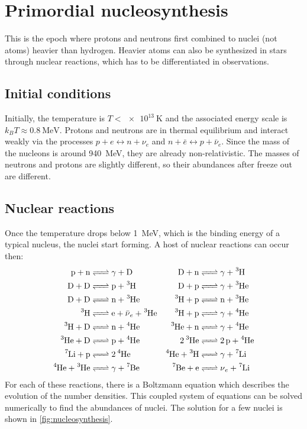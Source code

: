 \section{Primordial nucleosynthesis}

This is the epoch where protons and neutrons first combined to nuclei (not atoms) heavier than hydrogen. Heavier atoms can also be synthesized in stars through nuclear reactions, which has to be differentiated in observations.

\subsection*{Initial conditions}

Initially, the temperature is $T < \SI{e13}{\kelvin}$ and the associated energy scale is $k_B T \approx \SI{0.8}{\MeV}$. Protons and neutrons are in thermal equilibrium and interact weakly via the processes $p + e \leftrightarrow n + \nu_e$ and $n + \bar{e} \leftrightarrow p + \bar{\nu}_e$. Since the mass of the nucleons is around \SI{940}{\MeV}, they are already non-relativistic. The masses of neutrons and protons are slightly different, so their abundances after freeze out are different.

\subsection*{Nuclear reactions}

Once the temperature drops below \SI{1}{\MeV}, which is the binding energy of a typical nucleus, the nuclei start forming. A host of nuclear reactions can occur then:
\begin{align*}
	\ce{p + n &<=> \gamma{} + D} &
	\ce{D + n &<=> \gamma{} + ^3H} \\
	\ce{D + D &<=> p + ^3H} &
	\ce{D + p &<=> \gamma{} + ^3He} \\
	\ce{D + D &<=> n + ^3He} &
	\ce{^3H + p &<=> n + ^3He} \\
	\ce{^3H &<=> e + \bar{\nu}_e + ^3He} &
	\ce{^3H + p &<=> \gamma{} + ^4He} \\
	\ce{^3H + D &<=> n + ^4He} & 
	\ce{^3He + n &<=> \gamma{} + ^4He} \\
	\ce{^3He + D &<=> p + ^4He} &
	\ce{2 ^3He &<=> 2p + ^4He} \\
	\ce{^7Li + p &<=> 2 ^4He} &
	\ce{^4He + ^3H &<=> \gamma{} + ^7Li} \\
	\ce{^4He + ^3He &<=> \gamma{} + ^7Be} &
	\ce{^7Be + e &<=> \nu_e + ^7Li}
\end{align*}
For each of these reactions, there is a Boltzmann equation which describes the evolution of the number densities. This coupled system of equations can be solved numerically to find the abundances of nuclei. The solution for a few nuclei is shown in \cref{fig:nucleosynthesis}.


